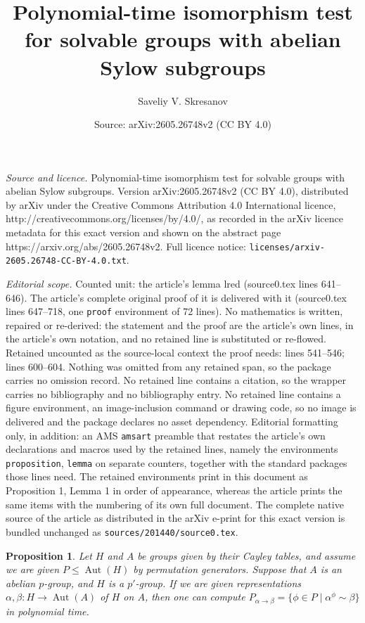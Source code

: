 \documentclass[10pt,a4paper]{amsart}
\title{Polynomial-time isomorphism test for solvable groups with abelian Sylow subgroups}
\author{Saveliy V. Skresanov}
\date{Source: arXiv:2605.26748v2 (CC BY 4.0)}
\newtheorem{proposition}{Proposition}
\DeclareMathOperator{\Aut}{Aut}
\begin{document}
\maketitle

\noindent\emph{Source and licence.} Polynomial-time isomorphism test for solvable groups with abelian Sylow subgroups. Version arXiv:2605.26748v2 (CC BY 4.0), distributed by arXiv under the Creative Commons Attribution 4.0 International licence, http://creativecommons.org/licenses/by/4.0/, as recorded in the arXiv licence metadata for this exact version and shown on the abstract page https://arxiv.org/abs/2605.26748v2. Full licence notice: \texttt{licenses/arxiv-2605.26748-CC-BY-4.0.txt}.\par\smallskip

\noindent\textit{Editorial scope.} Counted unit: the article's lemma lred (source0.tex lines 641--646). The article's complete original proof of it is delivered with it (source0.tex lines 647--718, one \texttt{proof} environment of 72 lines). No mathematics is written, repaired or re-derived: the statement and the proof are the article's own lines, in the article's own notation, and no retained line is substituted or re-flowed.  Retained uncounted as the source-local context the proof needs: lines 541--546; lines 600--604.  Nothing was omitted from any retained span, so the package carries no omission record.  No retained line contains a citation, so the wrapper carries no bibliography and no bibliography entry.  No retained line contains a figure environment, an image-inclusion command or drawing code, so no image is delivered and the package declares no asset dependency.  Editorial formatting only, in addition: an AMS \texttt{amsart} preamble that restates the article's own declarations and macros used by the retained lines, namely the environments \texttt{proposition}, \texttt{lemma} on separate counters, together with the standard packages those lines need.  The retained environments print in this document as Proposition 1, Lemma 1 in order of appearance, whereas the article prints the same items with the numbering of its own full document.  The complete native source of the article as distributed in the arXiv e-print for this exact version is bundled unchanged as \texttt{sources/201440/source0.tex}.
\begin{proposition}\label{ptop}
	Let \( H \) and \( A \) be groups given by their Cayley tables, and assume we are given \( P \leq \Aut(H) \) 
	by permutation generators. Suppose that \( A \) is an abelian \( p \)-group, and \( H \) is a \( p' \)-group.
	If we are given representations \( \alpha, \beta : H \to \Aut(A) \) of \( H \) on \( A \), then one can compute
	\( P_{\alpha \to \beta} = \{ \phi \in P \mid \alpha^\phi \sim \beta \} \) in polynomial time.
\end{proposition}
\end{document}
